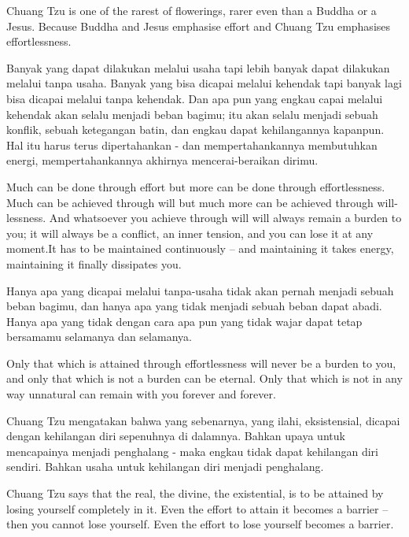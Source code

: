 \english
Chuang Tzu is one of the rarest of flowerings, rarer even than a Buddha or a Jesus. Because Buddha and Jesus emphasise effort and Chuang Tzu emphasises effortlessness.

\bahasa
Banyak yang dapat dilakukan melalui usaha tapi lebih banyak dapat dilakukan melalui tanpa usaha. Banyak yang bisa dicapai melalui kehendak tapi banyak lagi bisa dicapai melalui tanpa kehendak. Dan apa pun yang engkau capai melalui kehendak akan selalu menjadi beban bagimu; itu akan selalu menjadi sebuah konflik, sebuah ketegangan batin, dan engkau dapat kehilangannya kapanpun. Hal itu harus terus dipertahankan - dan mempertahankannya membutuhkan energi, mempertahankannya akhirnya mencerai-beraikan dirimu.

\english
Much can be done through effort but more can be done through effortlessness. Much can be achieved through will but much more can be achieved through will-lessness. And whatsoever you achieve through will will always remain a burden to you; it will always be a conflict, an inner tension, and you can lose it at any moment.It has to be maintained continuously – and maintaining it takes energy, maintaining it finally dissipates you.

\bahasa
Hanya apa yang dicapai melalui tanpa-usaha tidak akan pernah menjadi sebuah beban bagimu, dan hanya apa yang tidak menjadi sebuah beban dapat abadi. Hanya apa yang tidak dengan cara apa pun yang tidak wajar dapat tetap bersamamu selamanya dan selamanya.

\english
Only that which is attained through effortlessness will never be a burden to you, and only that which is not a burden can be eternal. Only that which is not in any way unnatural can remain with you forever and forever.

\bahasa
Chuang Tzu mengatakan bahwa yang sebenarnya, yang ilahi, eksistensial, dicapai dengan kehilangan diri sepenuhnya di dalamnya. Bahkan upaya untuk mencapainya menjadi penghalang - maka engkau tidak dapat kehilangan diri sendiri. Bahkan usaha untuk kehilangan diri menjadi penghalang.

\english
Chuang Tzu says that the real, the divine, the existential, is to be attained by losing yourself completely in it. Even the effort to attain it becomes a barrier – then you cannot lose yourself. Even the effort to lose yourself becomes a barrier.
